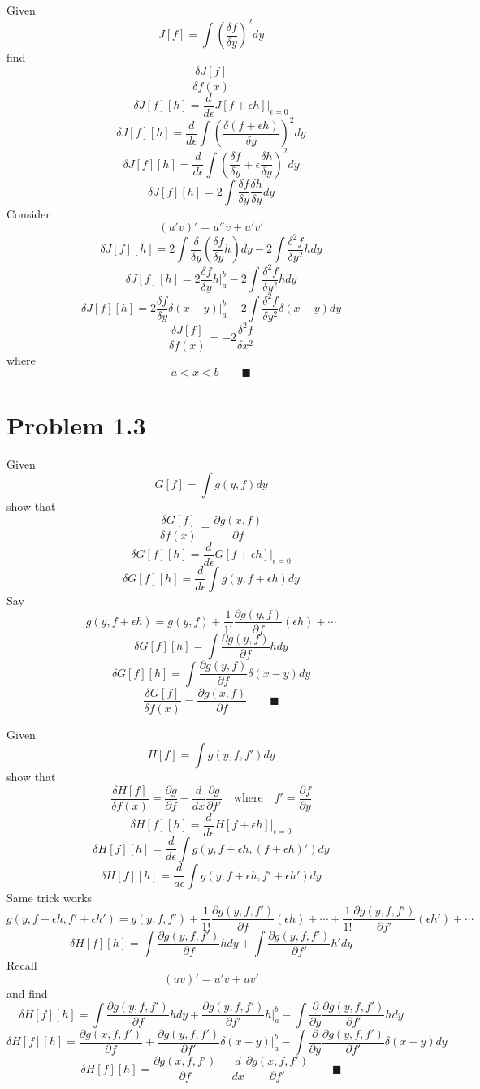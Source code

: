 \documentclass{amsart}
\begin{document}
Given
\[J[f]=\int \left(\frac{\delta f}{\delta y}\right)^2 dy\]
find
\[\frac{\delta J[f]}{\delta f(x)}\]
\[\delta J[f][h]=\frac{d}{d\epsilon}J[f+\epsilon h]\Big\vert_{\epsilon=0}\]
\[\delta J[f][h]=\frac{d}{d\epsilon}\int \left(\frac{\delta (f+\epsilon h)}{\delta y}\right)^2 dy\]
\[\delta J[f][h]=\frac{d}{d\epsilon}\int \left(\frac{\delta f}{\delta y}+\epsilon\frac{\delta h}{\delta y} \right)^2 dy\]
\[\delta J[f][h]=2\int \frac{\delta f}{\delta y}\frac{\delta h}{\delta y}  dy\]
Consider
\[(u'v)'=u''v+u'v'\]
\[\delta J[f][h]=2\int\frac{\delta}{\delta y}\left(\frac{\delta f}{\delta y}h\right)dy-2\int\frac{\delta^2 f}{\delta y^2}h dy\]
\[\delta J[f][h]=2\frac{\delta f}{\delta y}h\Big\vert_a^b-2\int\frac{\delta^2 f}{\delta y^2}h dy\]
\[\delta J[f][h]=2\frac{\delta f}{\delta y}\delta(x-y)\Big\vert_a^b-2\int\frac{\delta^2 f}{\delta y^2}\delta(x-y) dy\]
\[\frac{\delta J[f]}{\delta f(x)}=-2\frac{\delta^2 f}{\delta x^2}\] where \[a<x<b \qquad \blacksquare\]

\section*{Problem 1.3}
Given \[G[f]=\int g(y,f)dy\]
show that \[\frac{\delta G[f]}{\delta f(x)}=\frac{\partial g(x,f)}{\partial f} \]
\[\delta G[f][h]=\frac{d}{d\epsilon}G[f+\epsilon h]\Big\vert_{\epsilon=0}\]
\[\delta G[f][h]=\frac{d}{d\epsilon}\int g(y,f+\epsilon h)dy\]
Say \[g(y,f+\epsilon h)=g(y,f)+\frac{1}{1!}\frac{\partial g(y,f)}{\partial f}(\epsilon h) + \cdots \]
\[\delta G[f][h]=\int\frac{\partial g(y,f)}{\partial f}hdy\]
\[\delta G[f][h]=\int\frac{\partial g(y,f)}{\partial f}\delta(x-y)dy\]
\[\frac{\delta G[f]}{\delta f(x)}=\frac{\partial g(x,f)}{\partial f} \qquad \blacksquare\]

Given \[H[f]=\int g(y,f,f')dy\]
show that \[\frac{\delta H[f]}{\delta f(x)}=\frac{\partial g}{\partial f} -\frac{d}{dx}\frac{\partial g}{\partial f'} \quad\text{where}\quad f'=\frac{\partial f}{\partial y}\]
\[\delta H[f][h]=\frac{d}{d\epsilon}H[f+\epsilon h]\Big\vert_{\epsilon=0}\]
\[\delta H[f][h]=\frac{d}{d\epsilon}\int g(y,f+\epsilon h,(f+\epsilon h)')dy\]
\[\delta H[f][h]=\frac{d}{d\epsilon}\int g\left(y,f+\epsilon h,f'+\epsilon h'\right)dy\]
Same trick works \[g(y,f+\epsilon h,f'+\epsilon h')=g(y,f,f')+\frac{1}{1!}\frac{\partial g(y,f,f')}{\partial f}(\epsilon h) + \cdots +\frac{1}{1!}\frac{\partial g(y,f,f')}{\partial f'}(\epsilon h') + \cdots \]
\[\delta H[f][h]=\int\frac{\partial g(y,f,f')}{\partial f}hdy+\int\frac{\partial g(y,f,f')}{\partial f' }h'dy\] Recall \[(uv)'=u'v+uv'\] and find
\[\delta H[f][h]=\int\frac{\partial g(y,f,f')}{\partial f}hdy+\frac{\partial g(y,f,f')}{\partial f'}h\Big \vert_a^b-\int\frac{\partial}{\partial y}\frac{\partial g(y,f,f')}{\partial f'}hdy\]
\[\delta H[f][h]=\frac{\partial g(x,f,f')}{\partial f}+\frac{\partial g(y,f,f')}{\partial f'}\delta(x-y)\Big \vert_a^b-\int\frac{\partial}{\partial y}\frac{\partial g(y,f,f')}{\partial f'}\delta(x-y)dy\]
\[\delta H[f][h]=\frac{\partial g(x,f,f')}{\partial f}-\frac{d}{dx}\frac{\partial g(x,f,f')}{\partial f'} \qquad \blacksquare\]
\end{document}

